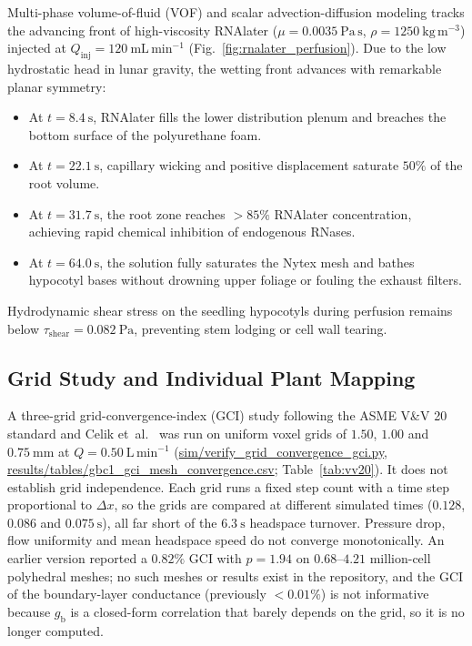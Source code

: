 \documentclass[pdflatex,sn-nature,iicol]{sn-jnl}
\begin{document}
Multi-phase volume-of-fluid (VOF) and scalar advection-diffusion modeling tracks the advancing front of high-viscosity RNAlater ($\mu = 0.0035\ \mathrm{Pa\,s}$, $\rho = 1250\ \mathrm{kg\,m^{-3}}$) injected at $Q_{\mathrm{inj}} = 120\ \mathrm{mL\,min^{-1}}$ (Fig.~\ref{fig:rnalater_perfusion}). Due to the low hydrostatic head in lunar gravity, the wetting front advances with remarkable planar symmetry:
\begin{itemize}
    \item At $t = 8.4\ \mathrm{s}$, RNAlater fills the lower distribution plenum and breaches the bottom surface of the polyurethane foam.
    \item At $t = 22.1\ \mathrm{s}$, capillary wicking and positive displacement saturate $50\%$ of the root volume.
    \item At $t = 31.7\ \mathrm{s}$, the root zone reaches $>85\%$ RNAlater concentration, achieving rapid chemical inhibition of endogenous RNases.
    \item At $t = 64.0\ \mathrm{s}$, the solution fully saturates the Nytex mesh and bathes hypocotyl bases without drowning upper foliage or fouling the exhaust filters.
\end{itemize}

Hydrodynamic shear stress on the seedling hypocotyls during perfusion remains below $\tau_{\mathrm{shear}} = 0.082\ \mathrm{Pa}$, preventing stem lodging or cell wall tearing.

\subsection{Grid Study and Individual Plant Mapping}\label{sec:vv20_hotspots}

A three-grid grid-convergence-index (GCI) study following the ASME V\&V 20 standard and Celik et~al.~\cite{celik2008procedure,roache1994perspective} was run on uniform voxel grids of $1.50$, $1.00$ and $0.75\ \mathrm{mm}$ at $Q = 0.50\ \mathrm{L\,min^{-1}}$ (\url{sim/verify_grid_convergence_gci.py}, \url{results/tables/gbc1_gci_mesh_convergence.csv}; Table~\ref{tab:vv20}). It does not establish grid independence. Each grid runs a fixed step count with a time step proportional to $\Delta x$, so the grids are compared at different simulated times ($0.128$, $0.086$ and $0.075\ \mathrm{s}$), all far short of the $6.3\ \mathrm{s}$ headspace turnover. Pressure drop, flow uniformity and mean headspace speed do not converge monotonically. An earlier version reported a $0.82\%$ GCI with $p = 1.94$ on $0.68$--$4.21$ million-cell polyhedral meshes; no such meshes or results exist in the repository, and the GCI of the boundary-layer conductance (previously $<0.01\%$) is not informative because $g_{\mathrm{b}}$ is a closed-form correlation that barely depends on the grid, so it is no longer computed.
\end{document}
